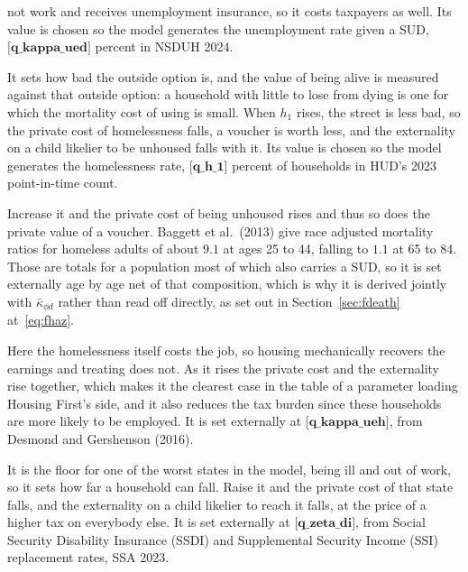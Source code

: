 \documentclass[10pt]{article}
\begin{document}
\begin{description}
not work and receives unemployment insurance, so it costs taxpayers as well.
Its value is chosen so the model
generates the unemployment rate given a SUD, $\textbf{[q_kappa_ued]}$ percent in NSDUH 2024.
\item[$h_1$, the service flow of homelessness.] It sets how bad the outside option
is, and the value of being alive is measured against that outside option: a
household with little to lose from dying is one for which the mortality cost of
using is small. When $h_1$ rises, the street is less bad, so the private
cost of homelessness falls, a voucher is worth less, and the externality on a child
likelier to be unhoused falls with it. Its value is chosen so the model generates the
homelessness rate, $\textbf{[q_h_1]}$ percent of households in HUD's 2023 point-in-time count.
\item[$\kappa_{\phi H}(j)$, mortality when homeless.] Increase it and the
private cost of being unhoused rises and thus so does the private value
of a voucher. Baggett et al.\ (2013) give race
adjusted mortality ratios for homeless adults of about $9.1$ at ages 25 to 44,
falling to $1.1$ at 65 to 84. Those are totals for a population most of which also
carries a SUD, so it is set externally age by age net of that composition, which is
why it is derived jointly with $\bar\kappa_{\phi d}$ rather than read off directly,
as set out in Section~\ref{sec:fdeath} at~\eqref{eq:fhaz}.
\item[$\kappa_{ueH}$, employment lost to homelessness.] Here the homelessness
itself costs the job, so housing mechanically recovers the earnings and treating
does not. As it rises the private cost and the externality rise
together, which makes it the clearest case in
the table of a parameter loading Housing First's side, and it also
reduces the tax burden since these households are more likely to be employed. It is set externally at
$\textbf{[q_kappa_ueh]}$, from Desmond and Gershenson (2016).
\item[$\zeta_{DI}$, the disability transfer for the non-employed with SMI.] It is
the floor for one of the worst states in the model, being ill and out of work, so it sets
how far a household can fall. Raise it and the private cost of that
state falls, and the externality on a child likelier to reach it falls, at the price
of a higher tax on everybody else. It is set externally at $\textbf{[q_zeta_di]}$,
from Social Security Disability Insurance (SSDI) and Supplemental Security Income (SSI) replacement rates, SSA 2023.
\item[$\underline c$, the food stamp \textcolor{red}{maximum allotment}.]

\end{description}
\end{document}
